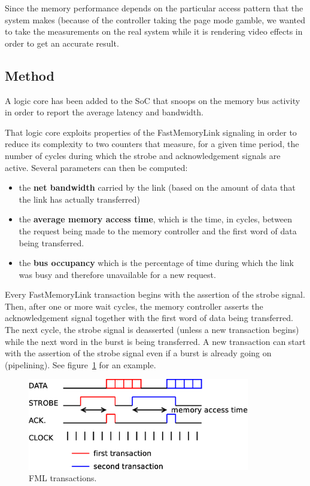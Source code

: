 \documentclass[a4paper,11pt]{kthesis}
\begin{document}
Since the memory performance depends on the particular access pattern that the system makes (because of the controller taking the page mode gamble, we wanted to take the measurements on the real system while it is rendering video effects in order to get an accurate result.

\subsection{Method}
A logic core has been added to the SoC that snoops on the memory bus activity in order to report the average latency and bandwidth.

That logic core exploits properties of the FastMemoryLink signaling in order to reduce its complexity to two counters that measure, for a given time period, the number of cycles during which the strobe and acknowledgement signals are active. Several parameters can then be computed:
\begin{itemize}
\item the \textbf{net bandwidth} carried by the link (based on the amount of data that the link has actually transferred)
\item the \textbf{average memory access time}, which is the time, in cycles, between the request being made to the memory controller and the first word of data being transferred.
\item the \textbf{bus occupancy} which is the percentage of time during which the link was busy and therefore unavailable for a new request.
\end{itemize}

Every FastMemoryLink transaction begins with the assertion of the strobe signal. Then, after one or more wait cycles, the memory controller asserts the acknowledgement signal together with the first word of data being transferred. The next cycle, the strobe signal is deasserted (unless a new transaction begins) while the next word in the burst is being transferred. A new transaction can start with the assertion of the strobe signal even if a burst is already going on (pipelining). See figure~\ref{fig:fmltransactions} for an example.

\begin{figure}
\centering
\includegraphics[height=40mm]{fmltransactions.eps}
\caption{FML transactions.} \label{fig:fmltransactions}
\end{figure}
\end{document}
